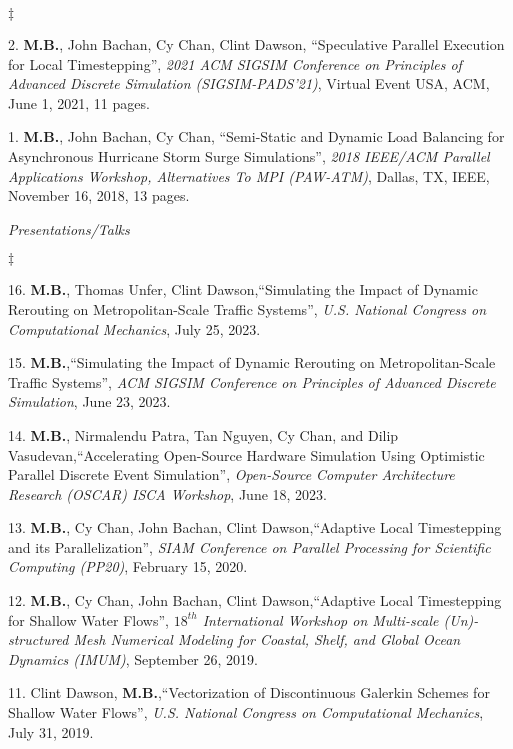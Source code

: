 \documentclass[margin,line]{res}
\newenvironment{list2}{
  \begin{list}{$\ddagger$}{%
      \setlength{\itemsep}{0in}
      \setlength{\parsep}{0in} \setlength{\parskip}{0in}
      \setlength{\topsep}{0in} \setlength{\partopsep}{0in}
      \setlength{\leftmargin}{0.2in}}}{\end{list}}
\newcommand{\inproceeding}[7]{%
#1, ``#2'', {\it #3}, #4, #5, #6, #7 pages.%
}
\newcommand{\talk}[4]{%
#1,``#2'', {\it #3}, #4.%
}
\begin{document}
\begin{resume}
\begin{list2}
\item[2.] \inproceeding{{\bf M.B.}, John Bachan, Cy Chan, Clint Dawson}{Speculative Parallel Execution for Local Timestepping}{2021 ACM SIGSIM Conference on Principles of Advanced Discrete Simulation (SIGSIM-PADS'21)}{Virtual Event USA}{ACM}{June 1, 2021}{11}
\item[1.] \inproceeding{{\bf M.B.}, John Bachan, Cy Chan}{Semi-Static and Dynamic Load Balancing for Asynchronous Hurricane Storm Surge Simulations}{2018 IEEE/ACM Parallel Applications Workshop, Alternatives To MPI (PAW-ATM)}{Dallas, TX}{IEEE}{November 16, 2018}{13}
\end{list2}


\textit{Presentations/Talks}
\vspace{0.05in}
\begin{list2}

\item[16.] \talk{{\bf M.B.}, Thomas Unfer, Clint Dawson}{Simulating the Impact of Dynamic Rerouting on Metropolitan-Scale Traffic Systems}{U.S. National Congress on Computational Mechanics}{July 25, 2023}

\item[15.] \talk{{\bf M.B.}}{Simulating the Impact of Dynamic Rerouting on Metropolitan-Scale Traffic Systems}{ACM SIGSIM Conference on Principles of Advanced Discrete Simulation}{June 23, 2023}

\item[14.] \talk{{\bf M.B.}, Nirmalendu Patra, Tan Nguyen, Cy Chan, and Dilip Vasudevan}{Accelerating Open-Source Hardware Simulation Using Optimistic Parallel Discrete Event Simulation}{Open-Source Computer Architecture Research (OSCAR) ISCA Workshop}{June 18, 2023}

\item[13.] \talk{{\bf M.B.}, Cy Chan, John Bachan, Clint Dawson}{Adaptive Local Timestepping and its Parallelization}{SIAM Conference on Parallel Processing for Scientific Computing (PP20)}{February 15, 2020}

\item[12.] \talk{{\bf M.B.}, Cy Chan, John Bachan, Clint Dawson}{Adaptive Local Timestepping for Shallow Water Flows}{$18^{th}$ International Workshop on Multi-scale (Un)-structured Mesh Numerical Modeling for Coastal, Shelf, and Global Ocean Dynamics (IMUM)}{September 26, 2019}

\item[11.] \talk{Clint Dawson, {\bf M.B.}}{Vectorization of Discontinuous Galerkin Schemes for Shallow Water Flows}{U.S. National Congress on Computational Mechanics}{July 31, 2019}


\end{list2}
\end{resume}
\end{document}
